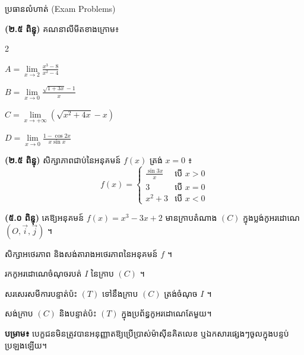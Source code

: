 \documentclass[theme=teal,margin=normal,11pt]{khmermath}
\begin{document}
	\begin{sectionbox}{ប្រធានលំហាត់ (Exam Problems)}
		\begin{circleenum}
			\item \textbf{(២.៥ ពិន្ទុ)} គណនាលីមីតខាងក្រោម៖
			\begin{multicols}{2}
				\begin{khmerenum}
					\item $A = \lim\limits_{x \to 2} \frac{x^3 - 8}{x^2 - 4}$
					\item $B = \lim\limits_{x \to 0} \frac{\sqrt{1+3x} - 1}{x}$
					\item $C = \lim\limits_{x \to +\infty} \left(\sqrt{x^2+4x} - x\right)$
					\item $D = \lim\limits_{x \to 0} \frac{1 - \cos 2x}{x \sin x}$
				\end{khmerenum}
			\end{multicols}

			\vspace{3pt}
			\item \textbf{(២.៥ ពិន្ទុ)} សិក្សាភាពជាប់នៃអនុគមន៍ $f(x)$ ត្រង់ $x = 0$ ៖
			\[
			f(x) = \begin{cases}
				\frac{\sin 3x}{x} & \text{បើ } x > 0 \\
				3 & \text{បើ } x = 0 \\
				x^2 + 3 & \text{បើ } x < 0
			\end{cases}
			\]

			\vspace{3pt}
			\item \textbf{(៥.០ ពិន្ទុ)} គេឱ្យអនុគមន៍ $f(x) = x^3 - 3x + 2$ មានក្រាបតំណាង $(C)$ ក្នុងប្លង់កូអរដោណេ $(O, \vec{i}, \vec{j})$ ។
			\begin{khmerenum}
				\item សិក្សាអថេរភាព និងសង់តារាងអថេរភាពនៃអនុគមន៍ $f$ ។
				\item រកកូអរដោណេចំណុចរបត់ $I$ នៃក្រាប $(C)$ ។
				\item សរសេរសមីការបន្ទាត់ប៉ះ $(T)$ ទៅនឹងក្រាប $(C)$ ត្រង់ចំណុច $I$ ។
				\item សង់ក្រាប $(C)$ និងបន្ទាត់ប៉ះ $(T)$ ក្នុងប្រព័ន្ធកូអរដោណេតែមួយ។
			\end{khmerenum}
		\end{circleenum}
	\end{sectionbox}

	\begin{notebox}
		\textbf{បម្រាម៖} បេក្ខជនមិនត្រូវបានអនុញ្ញាតឱ្យប្រើប្រាស់ម៉ាស៊ីនគិតលេខ ឬឯកសារផ្សេងៗចូលក្នុងបន្ទប់ប្រឡងឡើយ។
	\end{notebox}
\end{document}
